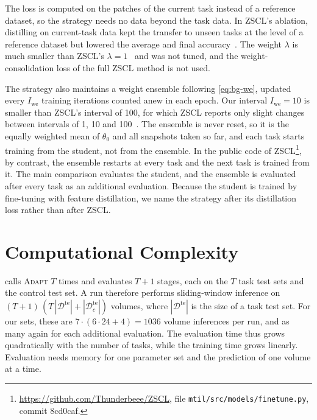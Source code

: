 The loss is computed on the patches of the current task instead of a reference dataset, so the strategy needs no data beyond the task data.
In ZSCL's ablation, distilling on current-task data kept the transfer to unseen tasks at the level of a reference dataset but lowered the average and final accuracy~\cite[Table~1b]{zheng2023preventingzeroshottransferdegradation}.
The weight $\lambda$ is much smaller than ZSCL's $\lambda = 1$~\cite[App.~B]{zheng2023preventingzeroshottransferdegradation} and was not tuned, and the weight-consolidation loss of the full ZSCL method is not used.

The strategy also maintains a weight ensemble following \cref{eq:bg-we}, updated every $I_{\mathrm{we}}$ training iterations counted anew in each epoch.
Our interval $I_{\mathrm{we}} = 10$ is smaller than ZSCL's interval of 100, for which ZSCL reports only slight changes between intervals of 1, 10 and 100~\cite[App.~B]{zheng2023preventingzeroshottransferdegradation}.
The ensemble is never reset, so it is the equally weighted mean of $\theta_0$ and all snapshots taken so far, and each task starts training from the student, not from the ensemble.
In the public code of ZSCL\footnote{\url{https://github.com/Thunderbeee/ZSCL}, file \texttt{mtil/src/models/finetune.py}, commit 8cd0caf.}, by contrast, the ensemble restarts at every task and the next task is trained from it.
The main comparison evaluates the student, and the ensemble is evaluated after every task as an additional evaluation.
Because the student is trained by fine-tuning with feature distillation, we name the strategy after its distillation loss rather than after ZSCL.

\section{Computational Complexity}
\label{sec:method-complexity}

 calls \textsc{Adapt} $T$ times and evaluates $T+1$ stages, each on the $T$ task test sets and the control test set.
A run therefore performs sliding-window inference on $(T+1)\,(T\,|\mathcal{D}^{\mathrm{te}}| + |\mathcal{D}_c^{\mathrm{te}}|)$ volumes, where $|\mathcal{D}^{\mathrm{te}}|$ is the size of a task test set.
For our sets, these are $7 \cdot (6 \cdot 24 + 4) = 1036$ volume inferences per run, and as many again for each additional evaluation.
The evaluation time thus grows quadratically with the number of tasks, while the training time grows linearly.
Evaluation needs memory for one parameter set and the prediction of one volume at a time.

